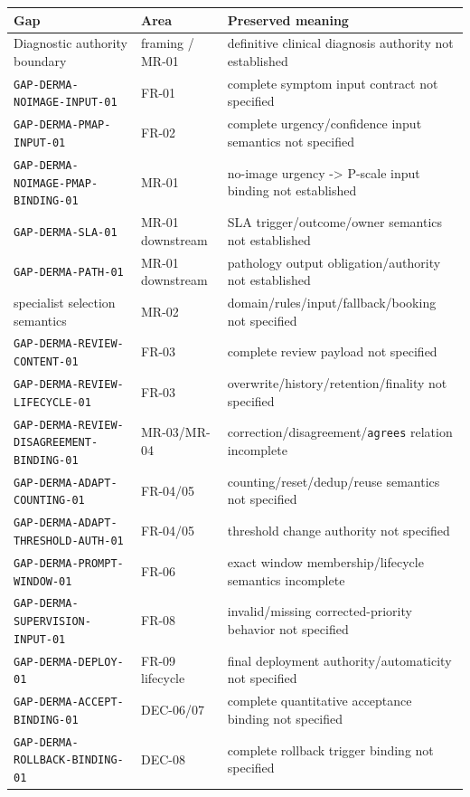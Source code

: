 \documentclass[11pt,a4paper]{article}
\begin{document}
\begin{longtable}[]{@{}lll@{}}
\toprule\noalign{}
Gap & Area & Preserved meaning \\
\midrule\noalign{}
\endhead
\bottomrule\noalign{}
\endlastfoot
Diagnostic authority boundary & framing / MR-01 & definitive clinical
diagnosis authority not established \\
\texttt{GAP-DERMA-NOIMAGE-INPUT-01} & FR-01 & complete symptom input
contract not specified \\
\texttt{GAP-DERMA-PMAP-INPUT-01} & FR-02 & complete urgency/confidence
input semantics not specified \\
\texttt{GAP-DERMA-NOIMAGE-PMAP-BINDING-01} & MR-01 & no-image urgency
-\textgreater{} P-scale input binding not established \\
\texttt{GAP-DERMA-SLA-01} & MR-01 downstream & SLA trigger/outcome/owner
semantics not established \\
\texttt{GAP-DERMA-PATH-01} & MR-01 downstream & pathology output
obligation/authority not established \\
specialist selection semantics & MR-02 &
domain/rules/input/fallback/booking not specified \\
\texttt{GAP-DERMA-REVIEW-CONTENT-01} & FR-03 & complete review payload
not specified \\
\texttt{GAP-DERMA-REVIEW-LIFECYCLE-01} & FR-03 &
overwrite/history/retention/finality not specified \\
\texttt{GAP-DERMA-REVIEW-DISAGREEMENT-BINDING-01} & MR-03/MR-04 &
correction/disagreement/\texttt{agrees} relation incomplete \\
\texttt{GAP-DERMA-ADAPT-COUNTING-01} & FR-04/05 &
counting/reset/dedup/reuse semantics not specified \\
\texttt{GAP-DERMA-ADAPT-THRESHOLD-AUTH-01} & FR-04/05 & threshold change
authority not specified \\
\texttt{GAP-DERMA-PROMPT-WINDOW-01} & FR-06 & exact window
membership/lifecycle semantics incomplete \\
\texttt{GAP-DERMA-SUPERVISION-INPUT-01} & FR-08 & invalid/missing
corrected-priority behavior not specified \\
\texttt{GAP-DERMA-DEPLOY-01} & FR-09 lifecycle & final deployment
authority/automaticity not specified \\
\texttt{GAP-DERMA-ACCEPT-BINDING-01} & DEC-06/07 & complete quantitative
acceptance binding not specified \\
\texttt{GAP-DERMA-ROLLBACK-BINDING-01} & DEC-08 & complete rollback
trigger binding not specified \\
\end{longtable}
\end{document}

